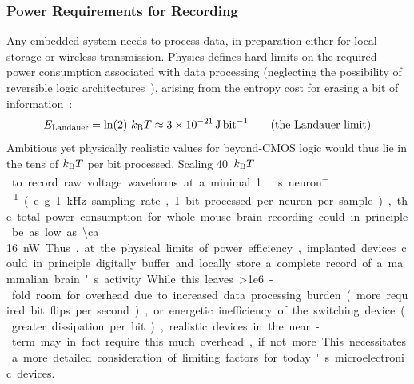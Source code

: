 \subsubsection{Power Requirements for Recording}

Any embedded system needs to process data, in preparation either for local storage or wireless transmission.
Physics defines hard limits on the required power consumption associated with data processing (neglecting the possibility of reversible logic architectures~\cite{bennett73}), arising from the entropy cost for erasing a bit of information~\cite{landauer61}:
\[E\sub{Landauer} = \ln(2)\ \kb T\approx \SI{3e-21}{\joule\per\bit} \label{eq:landauer} \tag{the Landauer limit}\]
Ambitious yet physically realistic values for beyond-CMOS logic would thus lie in the tens of $k_{\text{\scriptsize B}} T$ per bit processed.
Scaling \SI{40}{$k_{\text{\scriptsize B}} T$\per\bit} to record raw voltage waveforms at a minimal \SI{1}{\kilo\bit\per\second\per neuron} (e.g. \SI{1}{\kilo\hertz} sampling rate, 1 bit processed per neuron per sample), the total power consumption for whole mouse brain recording could in principle be as low as \SI{\ca 16}{\nano\watt}.
Thus, at the physical limits of power efficiency, implanted devices could in principle digitally buffer and locally store a complete record of a mammalian brain's activity.
While this leaves \num{>1e6}-fold room for overhead due to increased data processing burden (more required bit flips per second), or energetic inefficiency of the switching device (greater dissipation per bit), realistic devices in the near-term may in fact require this much overhead, if not more.
This necessitates a more detailed consideration of limiting factors for today's microelectronic devices.

